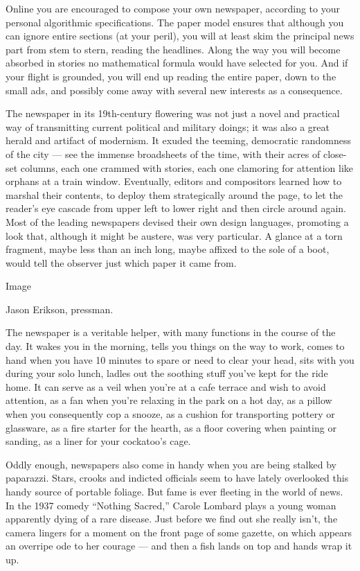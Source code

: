 Online you are encouraged to compose your own newspaper, according to
your personal algorithmic specifications. The paper model ensures that
although you can ignore entire sections (at your peril), you will at
least skim the principal news part from stem to stern, reading the
headlines. Along the way you will become absorbed in stories no
mathematical formula would have selected for you. And if your flight is
grounded, you will end up reading the entire paper, down to the small
ads, and possibly come away with several new interests as a consequence.

The newspaper in its 19th-century flowering was not just a novel and
practical way of transmitting current political and military doings; it
was also a great herald and artifact of modernism. It exuded the
teeming, democratic randomness of the city --- see the immense
broadsheets of the time, with their acres of close-set columns, each one
crammed with stories, each one clamoring for attention like orphans at a
train window. Eventually, editors and compositors learned how to marshal
their contents, to deploy them strategically around the page, to let the
reader's eye cascade from upper left to lower right and then circle
around again. Most of the leading newspapers devised their own design
languages, promoting a look that, although it might be austere, was very
particular. A glance at a torn fragment, maybe less than an inch long,
maybe affixed to the sole of a boot, would tell the observer just which
paper it came from.

Image

Jason Erikson, pressman.

The newspaper is a veritable helper, with many functions in the course
of the day. It wakes you in the morning, tells you things on the way to
work, comes to hand when you have 10 minutes to spare or need to clear
your head, sits with you during your solo lunch, ladles out the soothing
stuff you've kept for the ride home. It can serve as a veil when you're
at a cafe terrace and wish to avoid attention, as a fan when you're
relaxing in the park on a hot day, as a pillow when you consequently cop
a snooze, as a cushion for transporting pottery or glassware, as a fire
starter for the hearth, as a floor covering when painting or sanding, as
a liner for your cockatoo's cage.

Oddly enough, newspapers also come in handy when you are being stalked
by paparazzi. Stars, crooks and indicted officials seem to have lately
overlooked this handy source of portable foliage. But fame is ever
fleeting in the world of news. In the 1937 comedy ``Nothing Sacred,''
Carole Lombard plays a young woman apparently dying of a rare disease.
Just before we find out she really isn't, the camera lingers for a
moment on the front page of some gazette, on which appears an overripe
ode to her courage --- and then a fish lands on top and hands wrap it
up.

